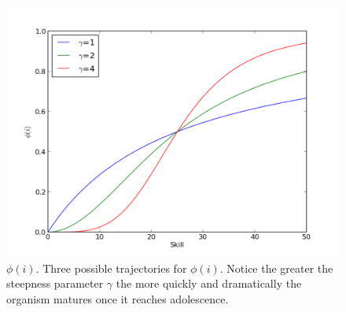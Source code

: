 \documentclass[12pt, letterpaper, fleqn]{article}
\begin{document}
	\clearpage
	\begin{figure}[h!]
	\caption{$\phi(i)$. Three possible trajectories for $\phi(i)$. Notice the greater the steepness parameter $\gamma$ the more quickly and dramatically the organism matures once it reaches adolescence. }
	\begin{center}
	\centerline{\includegraphics[width=160mm]{phi.pdf}}
	\end{center}
	\label{phi}
	\end{figure}
\end{document}
